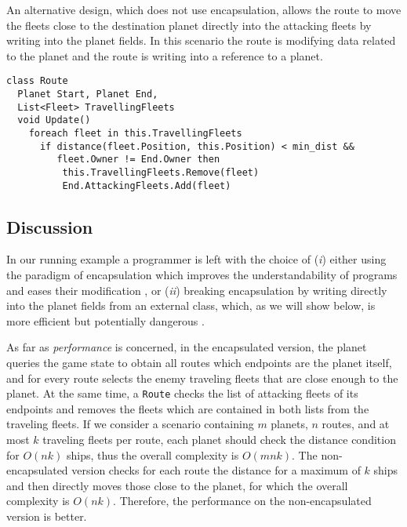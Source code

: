 An alternative design, which does not use encapsulation, allows the route to move the fleets close to the destination planet directly into the attacking fleets by writing into the planet fields. In this scenario the route is modifying data related to the planet and the route is writing into a reference to a planet.
\begin{lstlisting}
class Route
  Planet Start, Planet End,
  List<Fleet> TravellingFleets
  void Update()
    foreach fleet in this.TravellingFleets
      if distance(fleet.Position, this.Position) < min_dist && 
         fleet.Owner != End.Owner then
          this.TravellingFleets.Remove(fleet)
          End.AttackingFleets.Add(fleet)
\end{lstlisting}
\subsection{Discussion}
In our running example a programmer is left with the choice of (\textit{i}) either using the paradigm of encapsulation which improves the understandability of programs and eases their modification \cite{ENCAPSULATION_AND_INHERITANCE_IN_OOP}, or (\textit{ii}) breaking encapsulation by writing directly into the planet fields from an external class, which, as we will show below, is more efficient but potentially dangerous \cite{eder1994coupling}.

As far as \emph{performance} is concerned, in the encapsulated version, the planet queries the game state to obtain all routes which endpoints are the planet itself, and for every route selects the enemy traveling fleets that are close enough to the planet. At the same time, a \texttt{Route} checks the list of attacking fleets of its endpoints and removes the fleets which are contained in both lists from the traveling fleets. If we consider a scenario containing $m$ planets, $n$ routes, and at most $k$ traveling fleets per route, each planet should check the distance condition for $O(nk)$ ships, thus the overall complexity is $O(mnk)$. The non-encapsulated version checks for each route the distance for a maximum of $k$ ships and then directly moves those close to the planet, for which the overall complexity is $O(nk)$. Therefore, the performance on the non-encapsulated version is better.

